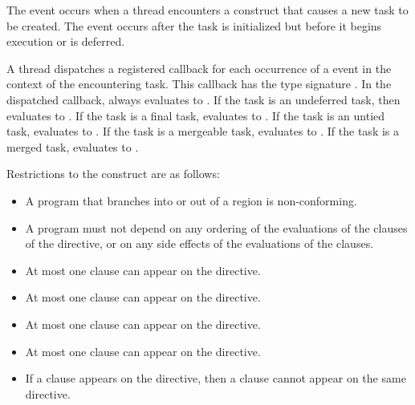 \events

The  event occurs when a thread encounters a construct
that causes a new task to be created.
The event occurs after the task is initialized but before
it begins execution or is deferred.

\tools

A thread dispatches a registered 
callback for each occurrence of a  event
in the context of the encountering task.
This callback has the type signature .
In the dispatched callback,  always
evaluates to .
If the task is an undeferred task, then  evaluates to .
If the task is a final task,  evaluates to .
If the task is an untied task,  evaluates to .
If the task is a mergeable task,  evaluates to .
If the task is a merged task,  evaluates to .

\restrictions
Restrictions to the  construct are as follows:

\begin{itemize}
\item A program that branches into or out of a  region is non-conforming.

\item A program must not depend on any ordering of the evaluations of the clauses of the
 directive, or on any side effects of the evaluations of the clauses.

\item At most one  clause can appear on the directive.

\item At most one  clause can appear on the directive.

\item At most one  clause can appear on the directive.

\item At most one  clause can appear on the directive.

\item If a  clause appears on the directive, then a  clause cannot appear on the same directive.


\end{itemize}

